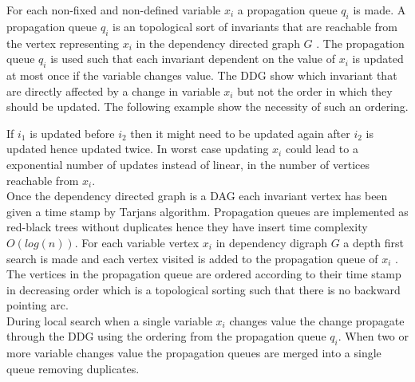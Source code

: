 For each non-fixed and non-defined variable $x_i$ a propagation queue $q_i$ is made. A propagation queue $q_i$ is an 
topological sort of invariants that are reachable from the vertex representing $x_i$ in the dependency directed 
graph $G$ . The propagation queue $q_i$ is used such that each invariant dependent on the 
value of $x_i$ is updated at most once if the variable changes value. The DDG show which invariant that are 
directly affected by a change in variable $x_i$ but not the order in which they should be updated. The following example 
show the necessity of such an ordering. 
\begin{center}
\end{center}
If $i_1$ is updated before $i_2$ then it might need to be updated again after $i_2$ is updated hence updated twice. In 
worst case updating $x_i$ could lead to a exponential number of updates instead of linear, in the number of vertices 
reachable from $x_i$. \\ 
Once the dependency directed graph is a DAG each invariant vertex has been given a time stamp by Tarjans algorithm. 
Propagation queues are implemented as red-black trees without duplicates hence they have insert time complexity 
$O(log(n))$. For each variable vertex $x_i$ in dependency digraph $G$ a depth first search is made and each vertex 
visited is added to the propagation queue of $x_i$ . The vertices in the propagation queue are ordered according to their time stamp in decreasing 
order which is a topological sorting such that there is no backward pointing arc. \medskip \\ 
During local search when a single variable $x_i$ changes value the change propagate through the DDG using 
the ordering from the propagation queue $q_i$. When two or more variable changes value the propagation queues are 
merged into a single queue removing duplicates.  